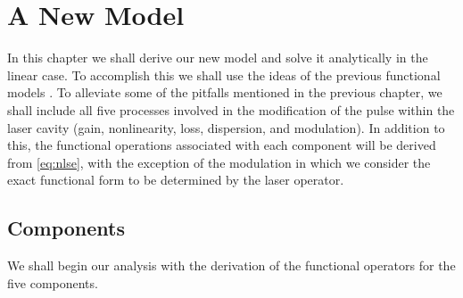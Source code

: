 
\chapter{A New Model}
\label{chap:linear}
In this chapter we shall derive our new model and solve it analytically in the linear case. To accomplish this we shall use the ideas of the previous functional models \cite{cutler, siegman, kuizenga1970a, kuizenga1970b, kuizenga1970, martinez1984, martinez1985, burgoyne2014}. To alleviate some of the pitfalls mentioned in the previous chapter, we shall include all five processes involved in the modification of the pulse within the laser cavity (gain, nonlinearity, loss, dispersion, and modulation). In addition to this, the functional operations associated with each component will be derived from \eqref{eq:nlse}, with the exception of the modulation in which we consider the exact functional form to be determined by the laser operator. \\

\section{Components}
\label{sec:comp}
We shall begin our analysis with the derivation of the functional operators for the five components. \\

